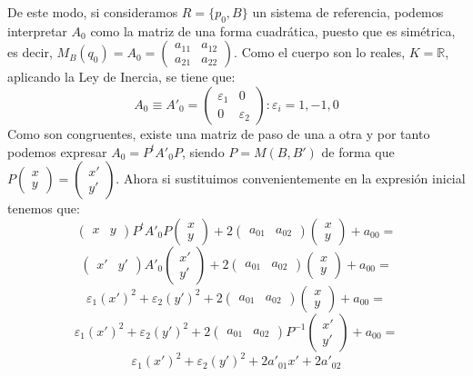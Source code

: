 \documentclass[10pt,a4paper,openright]{book}
\begin{document}
De este modo, si consideramos $R = \{p_0, B\}$ un sistema de referencia, podemos interpretar $A_0$ como la matriz de una forma cuadrática, puesto que es simétrica, es decir, $M_B (q_0) = A_0 = \begin{pmatrix}
a_{11} & a_{12} \\ a_{21} & a_{22}
\end{pmatrix}
$. Como el cuerpo son lo reales, $K = \mathbb{R}$, aplicando la Ley de Inercia, se tiene que:
$$A_0 \equiv A'_0 = \begin{pmatrix}
\varepsilon_1 & 0 \\ 0 & \varepsilon_2
\end{pmatrix}: \varepsilon_i = 1, - 1, 0$$
Como son congruentes, existe una matriz de paso de una a otra y por tanto podemos expresar $A_0 = P^t  A'_0 P $, siendo $P = M(B, B')$ de forma que $P \begin{pmatrix}
x \\ y
\end{pmatrix} = \begin{pmatrix}
x' \\ y'
\end{pmatrix}$. Ahora si sustituimos convenientemente en la expresión inicial tenemos que:
$$\begin{pmatrix}
x & y
\end{pmatrix}P^t  A'_0 P \begin{pmatrix}
x \\ y
\end{pmatrix} + 2 \begin{pmatrix}
a_{01} & a_{02} \end{pmatrix} \begin{pmatrix}
x \\ y
\end{pmatrix} + a_{00} = $$
$$\begin{pmatrix}
x' & y'
\end{pmatrix} A'_0 \begin{pmatrix}
x' \\ y'
\end{pmatrix} + 2 \begin{pmatrix}
a_{01} & a_{02} \end{pmatrix} \begin{pmatrix}
x \\ y
\end{pmatrix} + a_{00} =$$
$$\varepsilon_1 (x')^2 + \varepsilon_2 (y')^2 + 2 \begin{pmatrix}
a_{01} & a_{02} \end{pmatrix} \begin{pmatrix}
x \\ y
\end{pmatrix} + a_{00} =$$
$$ \varepsilon_1 (x')^2 + \varepsilon_2 (y')^2 + 2 \begin{pmatrix}
a_{01} & a_{02} \end{pmatrix} P^{-1} \begin{pmatrix}
x' \\ y'
\end{pmatrix} + a_{00} = $$
$$\varepsilon_1 (x')^2 + \varepsilon_2 (y')^2 + 2 a'_{01} x' + 2  a'_{02}$$
\end{document}
